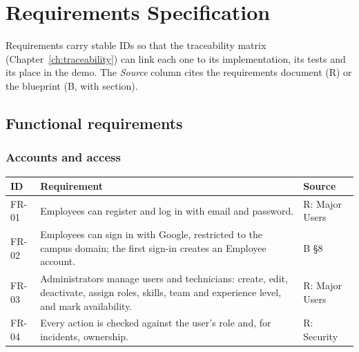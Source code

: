 \chapter{Requirements Specification}\label{ch:requirements}

Requirements carry stable IDs so that the traceability matrix (Chapter~\ref{ch:traceability})
can link each one to its implementation, its tests and its place in the demo. The
\emph{Source} column cites the requirements document (R) or the blueprint (B, with section).

\section{Functional requirements}

\subsection*{Accounts and access}
\begin{longtable}{@{}l>{\raggedright\arraybackslash}p{9.6cm}l@{}}
\toprule
\textbf{ID} & \textbf{Requirement} & \textbf{Source} \\
\midrule
\endhead
FR-01 & Employees can register and log in with email and password. & R: Major Users \\
FR-02 & Employees can sign in with Google, restricted to the campus domain; the first sign-in
  creates an Employee account. & B §8 \\
FR-03 & Administrators manage users and technicians: create, edit, deactivate, assign roles,
  skills, team and experience level, and mark availability. & R: Major Users \\
FR-04 & Every action is checked against the user's role and, for incidents, ownership. &
  R: Security \\
\bottomrule
\end{longtable}

